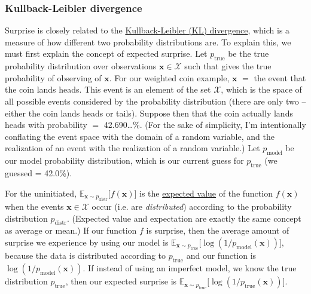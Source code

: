 \documentclass{article}
\begin{document}
\subsubsection*{Kullback-Leibler divergence}
Surprise is closely related to the \href{https://en.wikipedia.org/wiki/Kullback\%E2\%80\%93Leibler_divergence}{Kullback-Leibler (KL) divergence}, which is a measure of how different two probability distributions are. To explain this, we must first explain the concept of expected surprise. Let $p_{\mathrm{true}}$ be the true probability distribution over observations $\textbf{x}\in\mathcal{X}$ such that  gives the true probability of observing of $\textbf{x}$. For our weighted coin example, $\textbf{x}$ $=$ the event that the coin lands heads. This event is an element of the set $\mathcal{X}$, which is the space of all possible events considered by the probability distribution (there are only two -- either the coin lands heads or tails). Suppose then that the coin actually lands heads with probability  $=$ 42.690\dots\%. (For the sake of simplicity, I'm intentionally conflating the event space with the domain of a random variable, and the realization of an event with the realization of a random variable.) Let $p_{\mathrm{model}}$ be our model probability distribution, which is our current guess for $p_{\mathrm{true}}$ (we guessed  = 42.0\%). 

For the uninitiated, $\mathbb{E}_{\textbf{x} \sim p_{\mathrm{distr}}} \bigr[ f(\textbf{x}) \bigr]$ is the \href{https://en.wikipedia.org/wiki/Expected_value}{expected value} of the function $f(\textbf{x})$ when the events $\textbf{x}\in\mathcal{X}$ occur (i.e. are \emph{distributed}) according to the probability distribution $p_{\mathrm{distr}}$. (Expected value and expectation are exactly the same concept as average or mean.)  If our function $f$ is surprise, then the average amount of surprise we experience by using our model is $\mathbb{E}_{\textbf{x} \sim p_{\mathrm{true}}} \bigr[ \log (1/p_{\mathrm{model}}(\textbf{x})) \bigr]$, because the data is distributed according to $p_{\mathrm{true}}$ and our function is $\log (1/p_{\mathrm{model}}(\textbf{x}))$. If instead of using an imperfect model, we know the true distribution $p_{\mathrm{true}}$, then our expected surprise is $\mathbb{E}_{\textbf{x} \sim p_{\mathrm{true}}} \bigr[ \log (1/p_{\mathrm{true}}(\textbf{x})) \bigr]$. 
\end{document}
